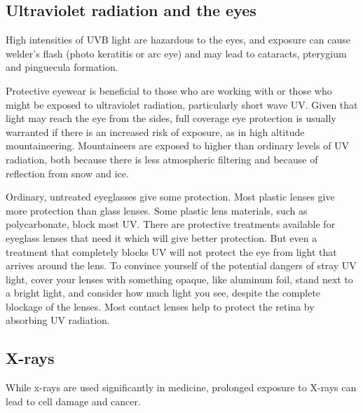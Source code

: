 
\subsection{Ultraviolet radiation and the eyes}
High intensities of UVB light are hazardous to the eyes, and exposure can cause welder's flash (photo keratitis or arc eye) and may lead to cataracts, pterygium and pinguecula formation.

Protective eyewear is beneficial to those who are working with or those who might be exposed to ultraviolet radiation, particularly short wave UV. Given that light may reach the eye from the sides, full coverage eye protection is usually warranted if there is an increased risk of exposure, as in high altitude mountaineering. Mountaineers are exposed to higher than ordinary levels of UV radiation, both because there is less atmospheric filtering and because of reflection from snow and ice.

Ordinary, untreated eyeglasses give some protection. Most plastic lenses give more protection than glass lenses. Some plastic lens materials, such as polycarbonate, block most UV. There are protective treatments available for eyeglass lenses that need it which will give better protection. But even a treatment that completely blocks UV will not protect the eye from light that arrives around the lens. To convince yourself of the potential dangers of stray UV light, cover your lenses with something opaque, like aluminum foil, stand next to a bright light, and consider how much light you see, despite the complete blockage of the lenses. Most contact lenses help to protect the retina by absorbing UV radiation.

\subsection{X-rays}
While x-rays are used significantly in medicine, prolonged exposure to X-rays can lead to cell damage and cancer.

